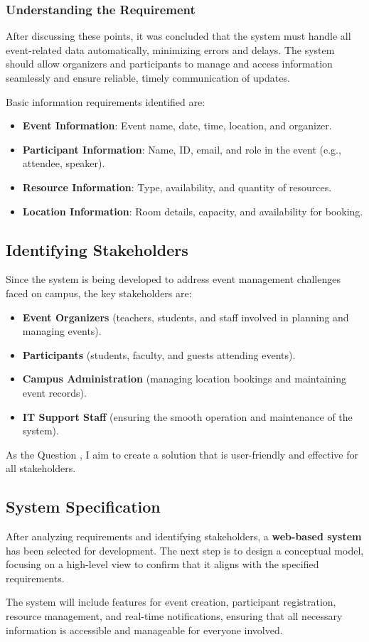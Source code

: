 \subsubsection{Understanding the Requirement}

After discussing these points, it was concluded that the system must handle all event-related data automatically, minimizing errors and delays. The system should allow organizers and participants to manage and access information seamlessly and ensure reliable, timely communication of updates.

Basic information requirements identified are:
\begin{itemize}
    \item \textbf{Event Information}: Event name, date, time, location, and organizer.
    \item \textbf{Participant Information}: Name, ID, email, and role in the event (e.g., attendee, speaker).
    \item \textbf{Resource Information}: Type, availability, and quantity of resources.
    \item \textbf{Location Information}: Room details, capacity, and availability for booking.
\end{itemize}

\subsection{Identifying Stakeholders}

Since the system is being developed to address event management challenges faced on campus, the key stakeholders are:

\begin{itemize}
    \item \textbf{Event Organizers} (teachers, students, and staff involved in planning and managing events).
    \item \textbf{Participants} (students, faculty, and guests attending events).
    \item \textbf{Campus Administration} (managing location bookings and maintaining event records).
    \item \textbf{IT Support Staff} (ensuring the smooth operation and maintenance of the system).
\end{itemize}

As the Question , I aim to create a solution that is user-friendly and effective for all stakeholders.

\subsection{System Specification}

After analyzing requirements and identifying stakeholders, a \textbf{web-based system} has been selected for development. The next step is to design a conceptual model, focusing on a high-level view to confirm that it aligns with the specified requirements.

The system will include features for event creation, participant registration, resource management, and real-time notifications, ensuring that all necessary information is accessible and manageable for everyone involved.
